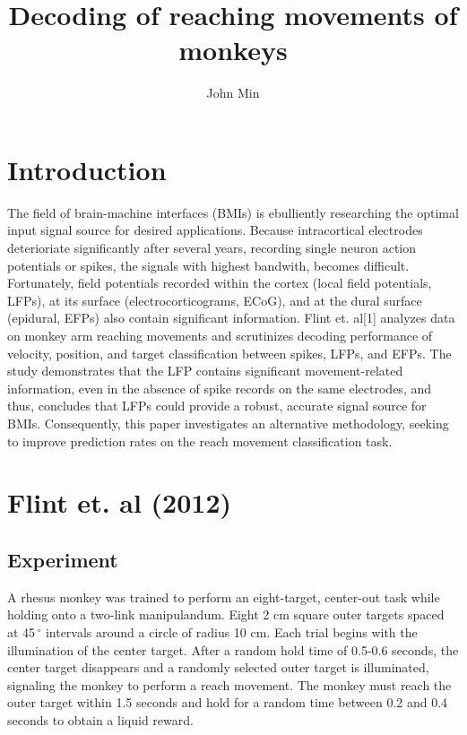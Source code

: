 \documentclass{article}
\begin{document}
\title{Decoding of reaching movements of monkeys}
\author{John Min}
\maketitle

\section{Introduction}

The field of brain-machine interfaces (BMIs) is ebulliently researching the optimal input signal source for desired applications.  Because intracortical electrodes deterioriate significantly after several years, recording single neuron action potentials or spikes, the signals with highest bandwith, becomes difficult.  Fortunately, field potentials recorded within the cortex (local field potentials, LFPs), at its surface (electrocorticograms, ECoG), and at the dural surface (epidural, EFPs) also contain significant information.  Flint et. al[1] analyzes data on monkey arm reaching movements and scrutinizes decoding performance of velocity, position, and target classification between spikes, LFPs, and EFPs.  The study demonstrates that the LFP contains significant movement-related information, even in the absence of spike records on the same electrodes, and thus, concludes that LFPs could provide a robust, accurate signal source for BMIs.  Consequently, this paper investigates an alternative methodology, seeking to improve prediction rates on the reach movement classification task.  


\section{Flint et. al (2012)}
\subsection{Experiment}
A rhesus monkey was trained to perform an eight-target, center-out task while holding onto a two-link manipulandum.  Eight 2 cm square outer targets spaced at 45$\,^{\circ}$ intervals around a circle of radius 10 cm.  Each trial begins with the illumination of the center target.  After a random hold time of 0.5-0.6 seconds, the center target disappears and a randomly selected outer target is illuminated, signaling the monkey to perform a reach movement.  The monkey must reach the outer target within 1.5 seconds and hold for a random time between 0.2 and 0.4 seconds to obtain a liquid reward.  
\end{document}

